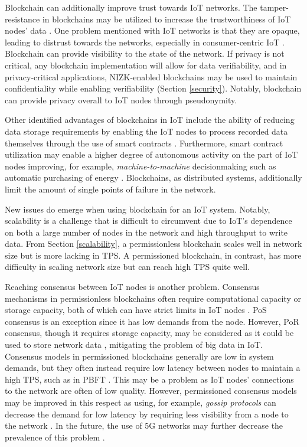 Blockchain can additionally improve trust towards IoT networks. The
tamper-resistance in blockchains may be utilized to increase the
trustworthiness of IoT nodes' data \cite{jaoudeApplications}. One
problem mentioned with IoT networks is that they are opaque, leading
to distrust towards the networks, especially in consumer-centric IoT
\cite{reynaIntegration}. Blockchain can provide visibility to the
state of the network. If privacy is not critical, any blockchain
implementation will allow for data verifiability, and in
privacy-critical applications, NIZK-enabled blockchains may be used to
maintain confidentiality while enabling verifiability (Section
\ref{security}). Notably, blockchain can provide privacy overall to
IoT nodes through pseudonymity. 

Other identified advantages of blockchains in IoT include the ability
of reducing data storage requirements by enabling the IoT nodes to
process recorded data themselves through the use of smart contracts
\cite{viriyasitavatIot}. Furthermore, smart contract utilization may
enable a higher degree of autonomous activity on the part of IoT nodes
improving, for example, \textit{machine-to-machine} decisionmaking
\cite{panInteroperability} such as automatic purchasing of energy
\cite{jaoudeApplications,viriyasitavatIot}. Blockchains, as
distributed systems, additionally limit the amount of single points of
failure in the network.

New issues do emerge when using blockchain for an IoT system. Notably,
scalability is a challenge that is difficult to circumvent due to
IoT's dependence on both a large number of nodes in the network and
high throughput to write data. From Section \ref{scalability}, a
permissionless blockchain scales well in network size but is more
lacking in TPS. A permissioned blockchain, in contrast, has more
difficulty in scaling network size but can reach high TPS quite well.

Reaching consensus between IoT nodes is another problem. Consensus
mechanisms in permissionless blockchains often require computational
capacity or storage capacity, both of which can have strict limits in
IoT nodes \cite{viriyasitavatIot}. PoS consensus is an exception since
it has low demands from the node. However, PoR consensus, though it
requires storage capacity, may be considered as it could be used to
store network data \cite{banoConsensus}, mitigating the problem of big
data in IoT. Consensus models in permissioned blockchains generally
are low in system demands, but they often instead require low latency
between nodes to maintain a high TPS, such as in PBFT
\cite{tomicPermissioned}. This may be a problem as IoT nodes'
connections to the network are often of low quality. However,
permissioned consensus models may be improved in this respect as
using, for example, \textit{gossip protocols} can decrease the demand
for low latency by requiring less visibility from a node to the
network \cite{banoConsensus}. In the future, the use of 5G networks
may further decrease the prevalence of this problem
\cite{sisinniIndustrial}.


